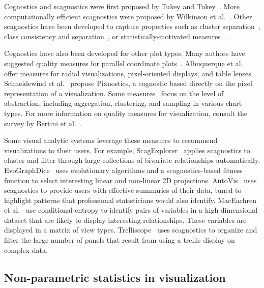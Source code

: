 Cognostics and scagnostics were first proposed by Tukey and Tukey~\cite{Tukey1982, Tukey1985}. More computationally efficient scagnostics were proposed by Wilkinson et al.~\cite{Wilkinson2005, Wilkinson2008}. Other scagnostics have been developed to capture properties such as cluster separation~\cite{Sedlmair2012, Tatu2009}, class consistency and separation~\cite{Sips2009, Schafer2013}, or statistically-motivated measures~\cite{Kandel2012, Seo2005, Piringer2008}.

Cognostics have also been developed for other plot types. Many authors have suggested quality measures for parallel coordinate plots~\cite{Ankerst1998, Dasgupta2010, Johansson2009, Yang2003}. Albuquerque et al.~\cite{Albuquerque2010} offer  measures for radial visualizations, pixel-oriented displays, and table lenses. Schneidewind et al.~\cite{Schneidewind2006} propose Pixnostics, a cognostic based directly on the pixel representation of a visualization. Some measures~\cite{Bertini2006, Cui2006, Yang2003} focus on the level of abstraction, including aggregation, clustering, and sampling in various chart types. For more information on quality measures for visualization, consult the survey by Bertini et al.~\cite{Bertini2011}. 

Some visual analytic systems leverage these measures to recommend visualizations to their users. For example, ScagExplorer~\cite{Dang2014} applies scagnostics to cluster and filter through large collections of bivariate relationships automatically.
EvoGraphDice~\cite{Boukhelifa2013} uses evolutionary algorithms and a scagnostics-based fitness function to select interesting linear and non-linear 2D projections.
AutoVis~\cite{Wills2010} uses scagnostics to provide users with effective summaries of their data, tuned to highlight patterns that professional statisticians would also identify.
MacEachren et al.~\cite{Maceachren2003} use conditional entropy to identify pairs of variables in a high-dimensional dataset that are likely to display interesting relationships. These variables are displayed in a matrix of view types. Trelliscope~\cite{Hafen2013} uses scagnostics to organize and filter the large number of panels that result from using a trellis display on complex data.



\subsection{Non-parametric statistics in visualization}

